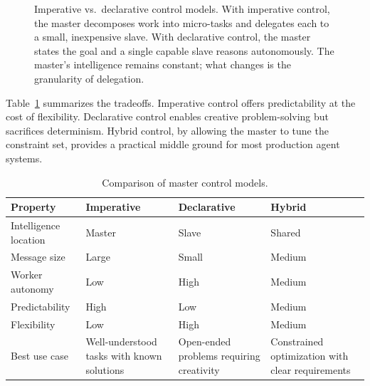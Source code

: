 \begin{figure}[t]
\caption{Imperative vs.\ declarative control models. With imperative control, the master decomposes work into micro-tasks and delegates each to a small, inexpensive slave. With declarative control, the master states the goal and a single capable slave reasons autonomously. The master's intelligence remains constant; what changes is the granularity of delegation.}
\label{fig:control_models}
\end{figure}

Table~\ref{tab:control_comparison} summarizes the tradeoffs. Imperative control offers predictability at the cost of flexibility. Declarative control enables creative problem-solving but sacrifices determinism. Hybrid control, by allowing the master to tune the constraint set, provides a practical middle ground for most production agent systems.

\begin{table}[t]
\centering
\caption{Comparison of master control models.}
\label{tab:control_comparison}
\begin{tabularx}{\textwidth}{lXXX}
\toprule
\textbf{Property} & \textbf{Imperative} & \textbf{Declarative} & \textbf{Hybrid} \\
\midrule
Intelligence location & Master & Slave & Shared \\
Message size & Large & Small & Medium \\
Worker autonomy & Low & High & Medium \\
Predictability & High & Low & Medium \\
Flexibility & Low & High & Medium \\
Best use case & Well-understood tasks with known solutions & Open-ended problems requiring creativity & Constrained optimization with clear requirements \\
\bottomrule
\end{tabularx}
\end{table}
